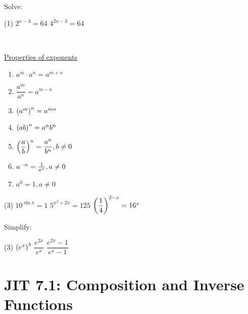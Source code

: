 \documentclass[mathNotesPreamble]{subfiles}
\begin{document}
  
  \pagebreak
  \begin{ex*}\ 
  
  \noindent
  \begin{minipage}[t]{0.625\linewidth}
    
    Solve:
    \begin{tasks}[after-item-skip=0.125\paperheight](1)
      \task $2^{x-3}=64$
      \task $4^{2x-3}=64$
    \end{tasks}
  \end{minipage}%
  \begin{minipage}[t]{0.375\linewidth}\ 
  
    \begin{thmBox*}
    \underline{Properties of exponents}
    \begin{enumerate}
      \item $a^m\cdot a^n=a^{m+n}$
      \item $\dfrac{a^m}{a^n}=a^{m-n}$
      \item $\parens{a^m}^n=a^{mn}$
      \item $\parens{ab}^n=a^nb^n$
      \item $\parens{\dfrac{a}{b}}^n=\dfrac{a^n}{b^n}, b\neq 0$
      \item $a\inv[n]=\frac{1}{a^n}, a\neq 0$
      \item $a^0=1, a\neq 0$
    \end{enumerate}
    \end{thmBox*}
  \end{minipage}%
  \begin{tasks}[resume, after-item-skip=0.075\paperheight](3)
    \task $10^{\sin x}=1$
    \task $5^{x^2+2x}=125$
    \task $\parens{\dfrac{1}{4}}^{2-x}=16^x$
  \end{tasks}
  \end{ex*}
  
  \begin{ex*}
    Simplify:
    \begin{tasks}(3)
      \task $\parens{e^x}^3$
      \task $\dfrac{e^{2x}}{e^x}$
      \task $\dfrac{e^{2x}-1}{e^x-1}$
    \end{tasks}
  \end{ex*}
  
  \pagebreak
  
  \section{JIT 7.1: Composition and Inverse Functions}
  
\end{document}
